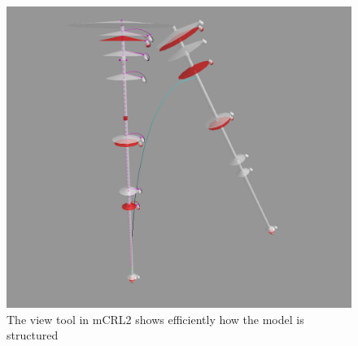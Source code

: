 \begin{figure}[!h]
	\includegraphics[width=\linewidth]{view2}
	\caption{The view tool in mCRL2 shows efficiently how the model is structured}
	\label{fig:view}
\end{figure}


